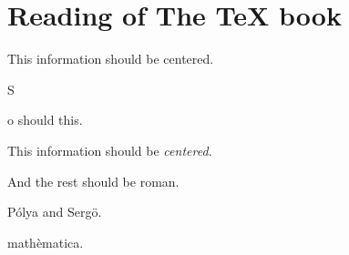 \documentclass{article}
\begin{document}
\section{Reading of The \TeX{} book}

\centerline{This information should be {centered}.}

\centerline So should this.

\centerline{This information should be \it centered.} And the rest
should be roman.

P\'olya and Serg\"o.

math\`ematica.
\end{document}
